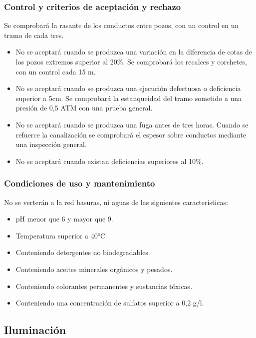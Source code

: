 \documentclass[../main.tex]{subfiles}
\begin{document}
\subsubsection{Control y criterios de aceptación y rechazo}
Se comprobará la rasante de los conductos entre pozos, con un control en un tramo de cada tres.
\begin{itemize}
    \item No se aceptará cuando se produzca una variación en la diferencia de cotas de los pozos extremos superior al 20\%. Se comprobará los recalces y corchetes, con un control cada 15 m.
    \item No se aceptará cuando se produzca una ejecución defectuosa o deficiencia superior a 5cm. Se comprobará la estanqueidad del tramo sometido a una presión de 0,5 ATM con una prueba general.
    \item No se aceptará cuando se produzca una fuga antes de tres horas. Cuando se refuerce la canalización se comprobará el espesor sobre conductos mediante una inspección general.
    \item No se aceptará cuando existan deficiencias superiores al 10\%.
\end{itemize}

\subsubsection{Condiciones de uso y mantenimiento}
No se verterán a la red basuras, ni aguas de las siguientes características:
\begin{itemize}
    \item pH menor que 6 y mayor que 9.
    \item Temperatura superior a 40°C
    \item Conteniendo detergentes no biodegradables.
    \item Conteniendo aceites minerales orgánicos y pesados.
    \item Conteniendo colorantes permanentes y sustancias tóxicas.
    \item Conteniendo una concentración de sulfatos superior a 0,2 g/l.
\end{itemize}

\subsection{Iluminación}
\end{document}
